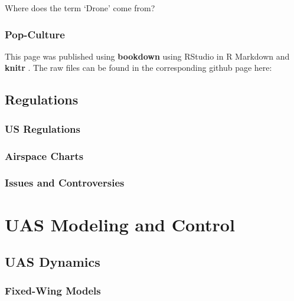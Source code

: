 \documentclass[
]{book}
\theoremstyle{definition}
\theoremstyle{definition}
\theoremstyle{definition}
\theoremstyle{remark}
\begin{document}
Where does the term `Drone' come from?

\hypertarget{pop-culture}{%
\section{Pop-Culture}\label{pop-culture}}

This page was published using \textbf{bookdown}\citep{R-bookdown} using RStudio in R Markdown and \textbf{knitr} \citep{xie2015}. The raw files can be found in the corresponding github page here:

\hypertarget{regulations}{%
\chapter{Regulations}\label{regulations}}

\hypertarget{us-regulations}{%
\section{US Regulations}\label{us-regulations}}

\hypertarget{airspace-charts}{%
\section{Airspace Charts}\label{airspace-charts}}

\hypertarget{issues-and-controversies}{%
\section{Issues and Controversies}\label{issues-and-controversies}}

\hypertarget{part-uas-modeling-and-control}{%
\part{UAS Modeling and Control}\label{part-uas-modeling-and-control}}

\hypertarget{uas-dynamics}{%
\chapter{UAS Dynamics}\label{uas-dynamics}}

\hypertarget{fixed-wing-models}{%
\section{Fixed-Wing Models}\label{fixed-wing-models}}
\end{document}
